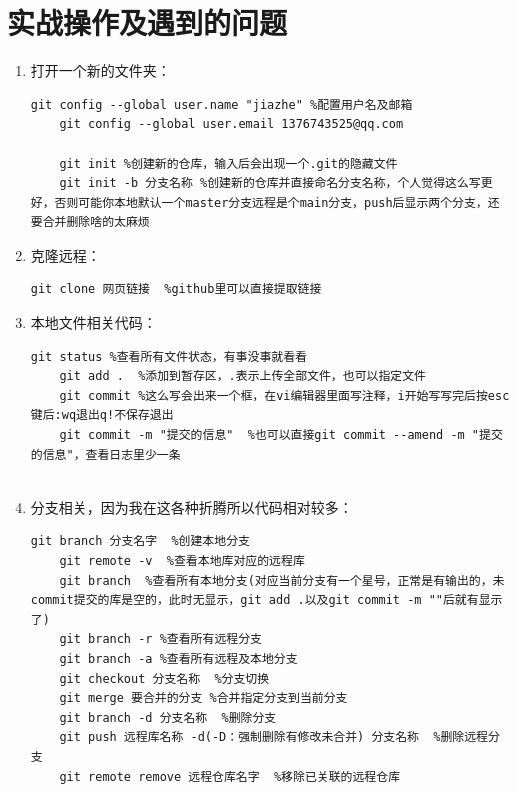 \documentclass{article}
\begin{document}
\section{实战操作及遇到的问题}
\begin{enumerate}
\item 打开一个新的文件夹：
\begin{lstlisting}[breaklines=true]
	git config --global user.name "jiazhe" %配置用户名及邮箱
	git config --global user.email 1376743525@qq.com
	
	git init %创建新的仓库，输入后会出现一个.git的隐藏文件
	git init -b 分支名称 %创建新的仓库并直接命名分支名称，个人觉得这么写更好，否则可能你本地默认一个master分支远程是个main分支，push后显示两个分支，还要合并删除啥的太麻烦
\end{lstlisting}

\item 克隆远程：
\begin{lstlisting}[breaklines=true]
	git clone 网页链接  %github里可以直接提取链接
\end{lstlisting}	
	
\item 本地文件相关代码：
\begin{lstlisting}[breaklines=true]
	git status %查看所有文件状态，有事没事就看看
	git add .  %添加到暂存区，.表示上传全部文件，也可以指定文件
	git commit %这么写会出来一个框，在vi编辑器里面写注释，i开始写写完后按esc键后:wq退出q!不保存退出
	git commit -m "提交的信息"  %也可以直接git commit --amend -m "提交的信息"，查看日志里少一条
	
\end{lstlisting}	

\item 分支相关，因为我在这各种折腾所以代码相对较多：
\begin{lstlisting}[breaklines=true]
	git branch 分支名字  %创建本地分支
	git remote -v  %查看本地库对应的远程库
	git branch  %查看所有本地分支(对应当前分支有一个星号，正常是有输出的，未commit提交的库是空的，此时无显示，git add .以及git commit -m ""后就有显示了)
	git branch -r %查看所有远程分支
	git branch -a %查看所有远程及本地分支
	git checkout 分支名称  %分支切换
	git merge 要合并的分支 %合并指定分支到当前分支
	git branch -d 分支名称  %删除分支
	git push 远程库名称 -d(-D：强制删除有修改未合并) 分支名称  %删除远程分支
	git remote remove 远程仓库名字  %移除已关联的远程仓库
				
\end{lstlisting}


\end{enumerate}
\end{document}
